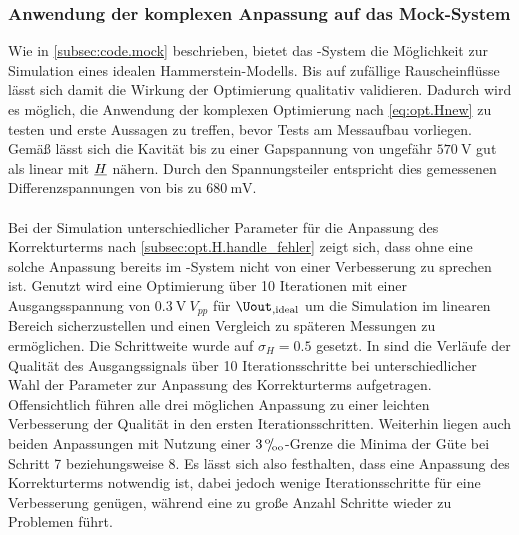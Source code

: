 \documentclass[../Report.tex]{subfiles}
\begin{document}
\subsubsection{Anwendung der komplexen Anpassung auf das Mock-System}
\label{subsubsec:opt.H.mock_simulation}

Wie in \ref{subsec:code.mock} beschrieben, bietet das \mock-System die Möglichkeit zur Simulation eines idealen Hammerstein-Modells. Bis auf zufällige Rauscheinflüsse lässt sich damit die Wirkung der Optimierung qualitativ validieren.
Dadurch wird es möglich, die Anwendung der komplexen Optimierung nach \eqref{eq:opt.Hnew} zu testen und erste Aussagen zu treffen, bevor Tests am Messaufbau vorliegen.
Gemäß \cite{gross17} lässt sich die Kavität bis zu einer Gapspannung von ungefähr $\SI{570}{\volt}$ gut als linear mit $\underline{H}$ nähern. Durch den Spannungsteiler entspricht dies gemessenen Differenzspannungen von bis zu $\SI{680}{\milli\volt}$.
\\
\\
Bei der Simulation unterschiedlicher Parameter für die Anpassung des Korrekturterms nach \ref{subsec:opt.H.handle_fehler} zeigt sich, dass ohne eine solche Anpassung bereits im \mock-System nicht von einer Verbesserung zu sprechen ist.
Genutzt wird eine Optimierung über 10 Iterationen mit einer Ausgangsspannung von $\SI{0.3}{\volt} ~ V_{pp}$ für $\Uout_{, \mathrm{ideal}}$ um die Simulation im linearen Bereich sicherzustellen und einen Vergleich zu späteren Messungen zu ermöglichen. Die Schrittweite wurde auf $\sigma_H = 0.5$ gesetzt.
In  sind die Verläufe der Qualität des Ausgangssignals über 10 Iterationsschritte bei unterschiedlicher Wahl der Parameter zur Anpassung des Korrekturterms aufgetragen. Offensichtlich führen alle drei möglichen Anpassung zu einer leichten Verbesserung der Qualität in den ersten Iterationsschritten. Weiterhin liegen auch beiden Anpassungen mit Nutzung einer $3 \, {}^\text{o}\mkern-5mu/\mkern-3mu_\text{oo}$-Grenze die Minima der Güte bei Schritt 7 beziehungsweise 8. 
Es lässt sich also festhalten, dass eine Anpassung des Korrekturterms notwendig ist, dabei jedoch wenige Iterationsschritte für eine Verbesserung genügen, während eine zu große Anzahl Schritte wieder zu Problemen führt. 

 \qualitySimple
{} \qualityThreePerm
{} \qualityAll
{} \qualityRMS
{} \qualityZeroPad
\end{document}
